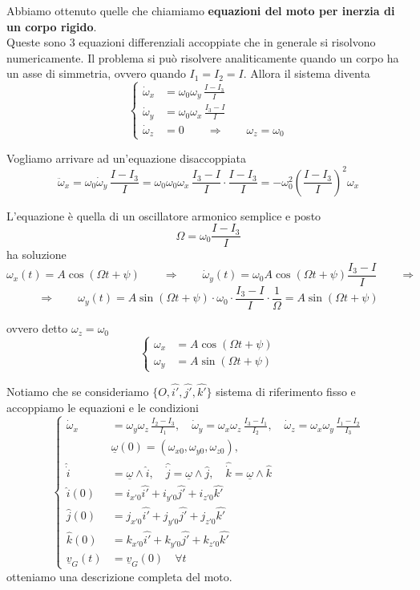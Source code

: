 Abbiamo ottenuto quelle che chiamiamo \textbf{equazioni del moto per inerzia di un corpo rigido}.\\
 Queste sono 3 equazioni differenziali accoppiate che in generale si risolvono numericamente. Il problema si può risolvere analiticamente quando un corpo ha un asse di simmetria, ovvero quando $I_1=I_2=I$. Allora il sistema diventa
\[
\left\{
\begin{aligned}
\dot{\omega}_x &= \omega_0\omega_y\,\frac{I-I_3}{I}\\[4pt]
\dot{\omega}_y &= \omega_0\omega_x\,\frac{I_3-I}{I}\\[4pt]
\dot{\omega}_z &= 0 \qquad \Rightarrow \qquad \omega_z=\omega_0
\end{aligned}
\right.
\]

Vogliamo arrivare ad un'equazione disaccoppiata
\[
\ddot{\omega}_x=\omega_0\dot{\omega}_y\,\frac{I-I_3}{I}
=\omega_0\omega_0\omega_x\,\frac{I_3-I}{I}\cdot\frac{I-I_3}{I}
=-\omega_0^2\left(\frac{I-I_3}{I}\right)^2\omega_x
\]

L'equazione è quella di un oscillatore armonico semplice e posto
\[
\Omega=\omega_0\frac{I-I_3}{I}
\]
ha soluzione
\[
\omega_x(t)=A\cos(\Omega t+\psi)
\qquad \Rightarrow \qquad
\dot{\omega}_y(t)=\omega_0A\cos(\Omega t+\psi)\frac{I_3-I}{I}
\qquad \Rightarrow
\]
\[
\Rightarrow \qquad
\omega_y(t)=A\sin(\Omega t+\psi)\cdot \omega_0\cdot\frac{I_3-I}{I}\cdot\frac{1}{\Omega}
= A\sin(\Omega t+\psi)
\]

ovvero detto $\omega_z=\omega_0$
\[
\left\{
\begin{aligned}
\omega_x &= A\cos(\Omega t+\psi)\\
\omega_y &= A\sin(\Omega t+\psi)
\end{aligned}
\right.
\]

Notiamo che se consideriamo $\{O , \hat{i'} , \hat{j'} , \hat{k'}\}$ sistema di riferimento fisso e accoppiamo le equazioni e le condizioni
\[
\left\{
\begin{aligned}
\dot{\omega}_x &= \omega_y\omega_z\,\frac{I_2-I_3}{I_1} , \quad  \dot{\omega}_y = \omega_x\omega_z\,\frac{I_3-I_1}{I_2}, \quad \dot{\omega}_z = \omega_x\omega_y\,\frac{I_1-I_2}{I_3}\\
& \underline{\omega}(0) = (\omega_{x0} , \omega_{y0} , \omega_{z0}),\\
\hat{\dot{i}} &= \underline{\omega} \wedge \hat{i}, \quad  \hat{\dot{j}} = \underline{\omega} \wedge \hat{j}, \quad  \hat{\dot{k}} = \underline{\omega} \wedge \hat{k}\\
\hat{i} (0) &= i_{x'0} \hat{i'} + i_{y'0} \hat{j'} + i_{z'0} \hat{k'} \\
\hat{j} (0) &= j_{x'0} \hat{i'} + j_{y'0} \hat{j'} + j_{z'0} \hat{k'} \\
\hat{k} (0) &= k_{x'0} \hat{i'} + k_{y'0} \hat{j'} + k_{z'0} \hat{k'}\\
\underline{v}_G(t) &= \underline{v}_G(0) \quad \forall t
\end{aligned}
\right.
\]
otteniamo una descrizione completa del moto.

